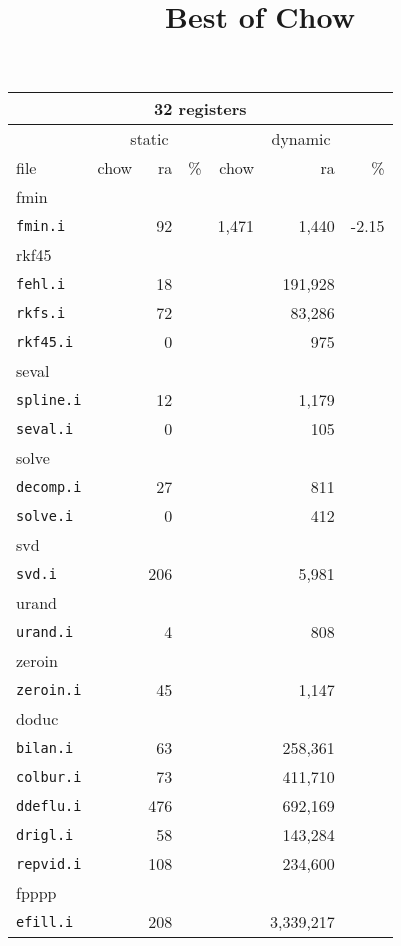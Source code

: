 \documentclass[11pt]{article}
\title{Best of Chow}
\begin{document}
\begin{tabular}{|l|r|r|r|r|r|r|}
\hline
\multicolumn{7}{|c|}{32 registers}\\
\hline
&\multicolumn{3}{c}{static}&\multicolumn{3}{|c|}{dynamic}\\
\hline
file&chow&ra&\%&chow&ra&\%\\
\hline
%
%
\multicolumn{7}{|l|}{fmin}\\
\hline
\texttt{fmin.i}&&92&&1,471&1,440&-2.15 \\
\hline
%
%
\multicolumn{7}{|l|}{rkf45}\\
\hline
\texttt{fehl.i}&&18&&&191,928& \\
\texttt{rkfs.i}&&72&&&83,286& \\
\texttt{rkf45.i}&&0&&&975& \\
%
%
\hline
\multicolumn{7}{|l|}{seval}\\
\hline
\texttt{spline.i}&&12&&&1,179& \\
\texttt{seval.i}&&0&&&105& \\
%
%
\hline
\multicolumn{7}{|l|}{solve}\\
\hline
\texttt{decomp.i}&&27&&&811& \\
\texttt{solve.i}&&0&&&412& \\
\hline
%
%
\multicolumn{7}{|l|}{svd}\\
\hline
\texttt{svd.i}&&206&&&5,981& \\
\hline
%
%
\multicolumn{7}{|l|}{urand}\\
\hline
\texttt{urand.i}&&4&&&808& \\
\hline
%
%
\multicolumn{7}{|l|}{zeroin}\\
\hline
\texttt{zeroin.i}&&45&&&1,147& \\
\hline
%
%
\multicolumn{7}{|l|}{doduc}\\
\hline
\texttt{bilan.i}&&63&&&258,361& \\
\texttt{colbur.i}&&73&&&411,710& \\
\texttt{ddeflu.i}&&476&&&692,169& \\
\texttt{drigl.i}&&58&&&143,284& \\
\texttt{repvid.i}&&108&&&234,600& \\
\hline
%
%
\multicolumn{7}{|l|}{fpppp}\\
\hline
\texttt{efill.i}&&208&&&3,339,217& \\
\hline

\hline
\end{tabular}
\end{document}
